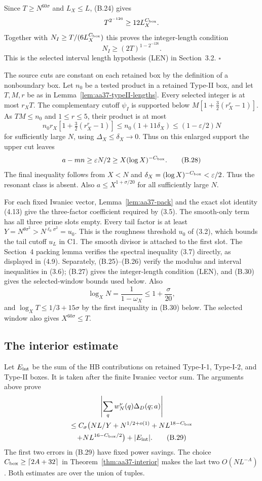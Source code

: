 Since $T\ge N^{60\sigma}$ and $L_X\le L$, (B.24) gives
\[
 T^{2^{-126}}\ge12L_X^{C_{\rm box}}.
\]
Together with $N_I\ge T/(6L_X^{C_{\rm box}})$ this proves the
integer-length condition
\[
 N_I\ge(2T)^{1-2^{-126}}.
 \tag{B.27}
\]
This is the selected interval length hypothesis (LEN) in Section~3.2.
\hfill$\square$

The source cuts are constant on each retained box by the definition
of a nonboundary box. Let $n_0$ be a tested product in a retained
Type-II box, and let $T,M,r$ be as in
Lemma~\ref{lem:aa37-typeII-lengths}. Every selected integer is at most
$r_XT$. The complementary cutoff $\psi_I$ is supported below
$M[1+\tfrac32(r_X^r-1)]$. As $TM\le n_0$ and $1\le r\le5$,
their product is at most
\[
 n_0r_X[1+\tfrac32(r_X^r-1)]
 \le n_0(1+11\delta_X)
 \le(1-\varepsilon/2)N
\]
for sufficiently large $N$, using $\Delta_X\le\delta_X\to0$.
Thus on this enlarged support the upper cut leaves
\[
 a-mn\ge\varepsilon N/2\ge X(\log X)^{-C_{\rm box}}.
 \tag{B.28}
\]
The final inequality follows from $X<N$ and
$\delta_X=(\log X)^{-C_{\rm box}}<\varepsilon/2$.
Thus the resonant class is absent. Also
$a\le X^{1+\sigma/20}$ for all sufficiently large $N$.

For each fixed Iwaniec vector, Lemma~\ref{lem:aa37-pack} and the exact slot identity
(4.13) give the three-factor coefficient required by (3.5).
The smooth-only term has all three prime slots empty. Every tail factor
is at least $Y=N^{\theta\sigma^2}>N^{\ell_0\sigma^2}=u_0$.
This is the roughness threshold $u_0$ of (3.2), which bounds the tail
cutoff $u_L$ in C1. The smooth divisor is attached to the first
slot. The Section~4 packing lemma verifies the spectral inequality
(3.7) directly, as displayed in (4.9). Separately, (B.25)--(B.26)
verify the modulus and interval inequalities in (3.6); (B.27) gives
the integer-length condition (LEN), and (B.30) gives the selected-window
bounds used below. Also
\[
 \log_XN=\frac1{1-\omega_X}\le1+\frac{\sigma}{20},
\]
and $\log_XT\le1/3+15\sigma$ by the first inequality in (B.30) below.
The selected window also gives $X^{60\sigma}\le T$.

\subsection*{The interior estimate}

Let $E_{\rm int}$ be the sum of the HB contributions on retained
Type-I-1, Type-I-2, and Type-II boxes. It is taken after the finite
Iwaniec vector sum.
The arguments above prove
\begin{multline*}
 \left|\sum_qw_N^\nu(q)\Delta_D(q;a)\right|
 \\
 \le C_\sigma\bigl(
 NL/Y+N^{1/2+o(1)}+NL^{18-C_{\rm box}}\\
       +NL^{16-C_{\rm box}/2}\bigr)+|E_{\rm int}|.
 \tag{B.29}
\end{multline*}
The first two errors in (B.29) have fixed power savings. The choice
$C_{\rm box}\ge\lceil2A+32\rceil$ in Theorem~\ref{thm:aa37-interior}
makes the last two
$O(NL^{-A})$. Both estimates are over the union of tuples.


